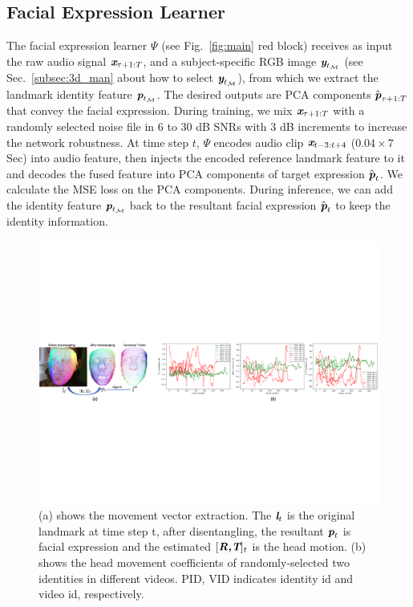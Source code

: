 \documentclass[runningheads]{llncs}
\def\mathbi#1{\textbf{\em #1}}
\begin{document}
\subsection{Facial Expression Learner}
\label{subsec:facial_exp}
The facial expression learner $\Psi$ (see Fig.~\ref{fig:main} red block) receives as input the raw audio signal $\mathbi{x}_{\tau +1:T}$, and a subject-specific RGB image $\mathbi{y}_{t_{\mathcal{M}}}$ (see Sec.~\ref{subsec:3d_man} about how to select $\mathbi{y}_{t_{\mathcal{M}}}$), from which we extract the landmark identity feature $\mathbi{p}_{t_{\mathcal{M}}}$. The desired outputs are PCA components ${\hat{\mathbi{p}}}_{\tau + 1 :T}$ that convey the facial expression. During training, we mix $\mathbi{x}_{\tau +1:T}$ with a randomly selected noise file in 6 to 30 dB SNRs with 3 dB increments to increase the network robustness. At time step $t$, $\Psi$ encodes audio clip $\mathbi{x}_{t-3:t+4}$ ($0.04 \times 7$ Sec) into audio feature, then injects the encoded reference landmark feature to it and decodes the fused feature into PCA components of target expression ${\hat{\mathbi{p}}}_{t}$. We calculate the MSE loss on the PCA components. During inference, we can add the identity feature $\mathbi{p}_{t_{\mathcal{M}}}$ back to the resultant facial expression ${\hat{\mathbi{p}}}_{t}$ to keep the identity information. 
\begin{figure}[t]
\includegraphics[width= \linewidth]{latex/images/RT_reduce.pdf}
\caption{ (a) shows the movement vector extraction. The $\mathbi{l}_t$ is the original landmark at time step t, after disentangling, the resultant $\mathbi{p}_t$ is facial expression and the estimated $[\mathbi{R,T}]_t$ is the head motion. (b) shows the head movement coefficients of randomly-selected two identities in different videos. PID, VID indicates identity id and video id, respectively. }
\label{fig:rt_compute}
\end{figure}
\end{document}
